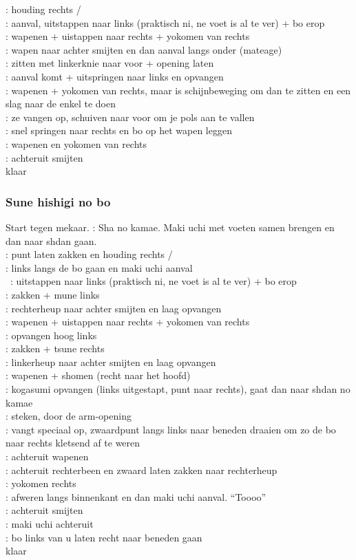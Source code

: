 \pB: houding rechts /\\
\pB: aanval, uitstappen naar links (praktisch ni, ne voet is al te ver) + bo erop\\
\pB: wapenen + uistappen naar rechts + yokomen van rechts\\
\pB: wapen naar achter smijten en dan aanval langs onder (mateage)\\
\pB: zitten met linkerknie naar voor + opening laten\\
\pB: aanval komt + uitspringen naar links en opvangen\\
\pB: wapenen + yokomen van rechts, maar is schijnbeweging om dan te zitten en een slag naar de enkel te doen\\
\pA: ze vangen op, schuiven naar voor om je pols aan te vallen\\
\pB: snel springen naar rechts en bo op het wapen leggen\\
\pB: wapenen en yokomen van rechts\\
\pB: achteruit smijten\\
klaar

\subsubsection{Sune hishigi no bo}

Start tegen mekaar.
\pA: Sha no kamae. Maki uchi met voeten samen brengen en dan naar shdan gaan.\\
\pB: punt laten zakken en houding rechts /\\
\pA: links langs de bo gaan en maki uchi aanval\\\
\pB: uitstappen naar links (praktisch ni, ne voet is al te ver) + bo erop\\
\pB: zakken + mune links\\
\pA: rechterheup naar achter smijten en laag opvangen\\
\pB: wapenen + uistappen naar rechts + yokomen van rechts\\
\pA: opvangen hoog links\\
\pB: zakken + tsune rechts\\
\pA: linkerheup naar achter smijten en laag opvangen\\
\pB: wapenen + shomen (recht naar het hoofd)\\
\pA: kogasumi opvangen (links uitgestapt, punt naar rechts), gaat dan naar shdan no kamae\\
\pB: steken, door de arm-opening\\
\pA: vangt speciaal op, zwaardpunt langs links naar beneden draaien om zo de bo naar rechts kletsend af te weren\\
\pB: achteruit wapenen\\
\pA: achteruit rechterbeen en zwaard laten zakken naar rechterheup\\
\pB: yokomen rechts\\
\pA: afweren langs binnenkant en dan maki uchi aanval. ``Toooo''\\
\pB: achteruit smijten\\
\pA: maki uchi achteruit\\
\pB: bo links van u laten recht naar beneden gaan\\
klaar

